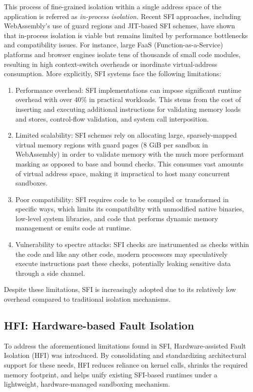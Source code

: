 \documentclass[conference,compsoc]{IEEEtran}
\begin{document}
This process of fine-grained isolation within a single address space of the application is referred as \textit{in-process isolation.}
Recent SFI approaches, including WebAssembly's use of guard regions and JIT-based SFI schemes, have shown that in-process isolation is viable but remains limited by performance bottlenecks and compatibility issues. 
For instance, large FaaS (Function-as-a-Service) platforms and browser engines isolate tens of thousands of small code modules, resulting in high context-switch overheads or inordinate virtual-address consumption.
More explicitly, SFI systems face the following limitations:
\begin{enumerate}
  \item Performance overhead: SFI implementations can impose significant runtime overhead with over $40\%$ in practical workloads. This stems from the cost of inserting and executing additional instructions for validating memory loads and stores, control-flow validation, and system call interposition. \\
  \item Limited scalability: SFI schemes rely on allocating large, sparsely-mapped virtual memory regions with guard pages (8 GiB per sandbox in WebAssembly) in order to validate memory with the much more performant masking as opposed to base and bound checks. This consumes vast amounts of virtual address space, making it impractical to host many concurrent sandboxes. \\
  \item Poor compatibility: SFI requires code to be compiled or transformed in specific ways, which limits its compatibility with unmodified native binaries, low-level system libraries, and code that performs dynamic memory management or emits code at runtime. \\
  \item Vulnerability to spectre attacks: SFI checks are instrumented as checks within the code and like any other code, modern processors may speculatively execute instructions past these checks, potentially leaking sensitive data through a side channel. 
\end{enumerate}

Despite these limitations, SFI is increasingly adopted due to its relatively low overhead compared to traditional isolation mechanisms.

\subsection{HFI: Hardware-based Fault Isolation}
To address the aforementioned limitations found in SFI, Hardware-assisted Fault Isolation (HFI)\cite{HFI} was introduced. By consolidating and standardizing architectural support for these needs, HFI reduces reliance on kernel calls, shrinks the required memory footprint, and helps unify existing SFI-based runtimes under a lightweight, hardware-managed sandboxing mechanism.
\end{document}
